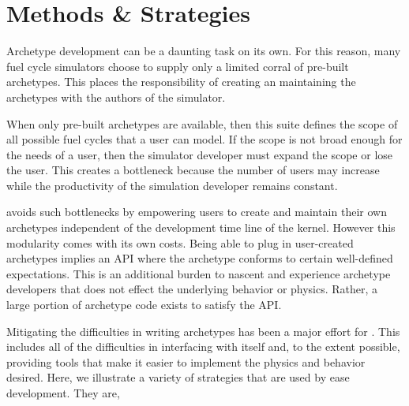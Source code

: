 \section{Methods \& Strategies}
\label{sec-methods}

Archetype development can be a daunting task on its own. For this reason, 
many fuel cycle simulators choose to supply only a limited corral of 
pre-built archetypes. This places the responsibility of creating an maintaining 
the archetypes with the authors of the simulator.

When only pre-built archetypes are available, then this suite defines the scope 
of all possible fuel cycles that a user can model. If the scope is not broad 
enough for the needs of a user, then the simulator developer  must expand the 
scope or lose the user.  This creates a bottleneck because the number of users 
may increase while the productivity of the simulation developer remains constant.

\Cyclus avoids such bottlenecks by empowering users to create and maintain 
their own archetypes independent of the development time line of the \cyclus 
kernel. However this modularity comes with its own costs. Being able to 
plug in user-created archetypes implies an \gls{API} where 
the archetype conforms to certain well-defined expectations. This is an 
additional burden to nascent and experience archetype developers that 
does not effect the underlying behavior or physics. Rather, a large portion 
of archetype code exists to satisfy the \cyclus \gls{API}.

Mitigating the difficulties in writing archetypes has been a major effort 
for \cyclus. This includes all of the difficulties in interfacing with 
\cyclus itself and, to the extent possible, providing tools that make it 
easier to implement the physics and behavior desired. Here, we illustrate 
a variety of strategies that are used by \cyclus ease development. They are, 

